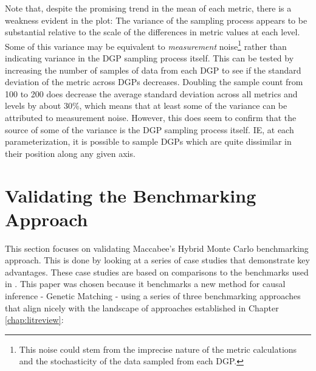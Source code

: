 \documentclass[../main.tex]{subfiles}
\begin{document}
Note that, despite the promising trend in the mean of each metric, there is a weakness evident in the plot: The variance of the sampling process appears to be substantial relative to the scale of the differences in metric values at each level. Some of this variance may be equivalent to \textit{measurement} noise\footnote{This noise could stem from the imprecise nature of the metric calculations and the stochasticity of the data sampled from each DGP.} rather than indicating variance in the DGP sampling process itself. This can be tested by increasing the number of samples of data from each DGP to see if the standard deviation of the metric across DGPs decreases. Doubling the sample count from 100 to 200 does decrease the average standard deviation across all metrics and levels by about 30\%, which means that at least some of the variance can be attributed to measurement noise. However, this does seem to confirm that the source of some of the variance is the DGP sampling process itself. IE, at each parameterization, it is possible to sample DGPs which are quite dissimilar in their position along any given axis.

\section{Validating the Benchmarking Approach}

This section focuses on validating Maccabee's Hybrid Monte Carlo benchmarking approach. This is done by looking at a series of case studies that demonstrate key advantages. These case studies are based on comparisons to the benchmarks used in \textcite{Diamond2012GeneticStudies}. This paper was chosen because it benchmarks a new method for causal inference - Genetic Matching - using a series of three benchmarking approaches that align nicely with the landscape of approaches established in Chapter \ref{chap:litreview}:
\end{document}
